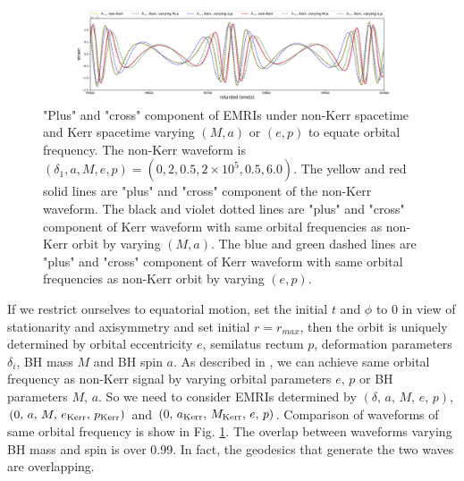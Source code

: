 \documentclass{article}
\begin{document}
\begin{figure}[!ht]
	\centering
	\includegraphics[width=16cm]{eg.pdf}
	
	\caption{"Plus" and "cross" component of EMRIs under non-Kerr spacetime and Kerr spacetime varying $(M,a)$ or $(e,p)$ to equate orbital frequency. The non-Kerr waveform is $(\delta_1,a,M,e,p)=(0,2,0.5,2\times10^5, 0.5,6.0)$. The yellow and red solid lines are "plus" and "cross" component of the non-Kerr waveform. The black and violet dotted lines are "plus" and "cross" component of Kerr waveform with same orbital frequencies as non-Kerr orbit by varying $(M,a)$. The blue and green dashed lines are "plus" and "cross" component of Kerr waveform with same orbital frequencies as non-Kerr orbit by varying $(e,p)$.}
	\label{kkwave}
\end{figure}	

If we restrict ourselves to equatorial motion, set the initial $t$ and $\phi$ to 0 in view of stationarity and axisymmetry and set initial $r=r_{max}$, then the orbit is uniquely determined by orbital eccentricity $e$, semilatus rectum $p$, deformation parameters $\delta_i$, BH mass $M$ and BH spin $a$. As described in \cite{majorPRD}, we can achieve same orbital frequency as non-Kerr signal by varying orbital parameters $e, \,p$ or BH parameters $M, \, a$. So we need to consider EMRIs determined by $(\delta,\, a,\, M,\, e,\, p)$, $(0,\, a,\, M,\, e_{\rm{Kerr}},\, p_{\rm{Kerr}})$ and $(0,\, a_{\rm{Kerr}},\, M_{\rm{Kerr}},\, e,\, p)$. Comparison of waveforms of same orbital frequency is show in Fig. \ref{kkwave}. The overlap between waveforms varying BH mass and spin is over 0.99. In fact, the geodesics that generate the two waves are overlapping.  
\end{document}
